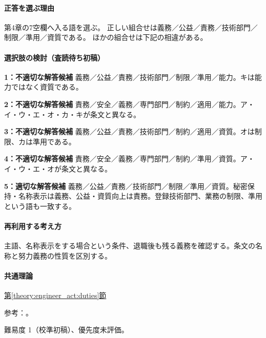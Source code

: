 \paragraph{正答を選ぶ理由} 第4章の7空欄へ入る語を選ぶ。 正しい組合せは義務／公益／責務／技術部門／制限／準用／資質である。 ほかの組合せは下記の相違がある。

\paragraph{選択肢の検討（査読待ち初稿）}\mbox{}\par

\noindent\textbf{1：不適切な解答候補} 義務／公益／責務／技術部門／制限／準用／能力。キは能力ではなく資質である。\par

\noindent\textbf{2：不適切な解答候補} 責務／安全／義務／専門部門／制約／適用／能力。ア・イ・ウ・エ・オ・カ・キが条文と異なる。\par

\noindent\textbf{3：不適切な解答候補} 義務／公益／責務／技術部門／制約／適用／資質。オは制限、カは準用である。\par

\noindent\textbf{4：不適切な解答候補} 責務／安全／義務／専門部門／制約／準用／資質。ア・イ・ウ・エ・オが条文と異なる。\par

\noindent\textbf{5：適切な解答候補} 義務／公益／責務／技術部門／制限／準用／資質。秘密保持・名称表示は義務、公益・資質向上は責務。登録技術部門、業務の制限、準用という語も一致する。\par

\paragraph{再利用する考え方} 主語、名称表示をする場合という条件、退職後も残る義務を確認する。条文の名称と努力義務の性質を区別する。

\paragraph{共通理論} \hyperref[theory:engineer_act:duties]{第\ref*{theory:engineer_act:duties}節}

\par 参考：\cite{engineer_act_current}。

\par 難易度 1（校準初稿）、優先度未評価。


